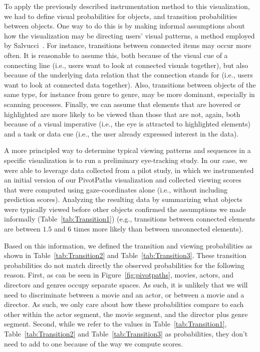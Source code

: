 To apply the previously described instrumentation method to this visualization, we had to define visual probabilities for objects, and transition probabilities between objects. One way to do this is by making informal assumptions about how the visualization may be directing users' visual patterns, a method employed by Salvucci~\cite{salvucci2000intelligent}. For instance, transitions between connected items may occur more often. It is reasonable to assume this, both because of the visual cue of a connecting line (i.e., users want to look at connected visuals together), but also because of the underlying data relation that the connection stands for (i.e., users want to look at connected data together). Also, transitions between objects of the same type, for instance from genre to genre, may be more dominant, especially in scanning processes. Finally, we can assume that elements that are hovered or highlighted are more likely to be viewed than those that are not, again, both because of a visual imperative (i.e., the eye is attracted to highlighted elements) and a task or data cue (i.e., the user already expressed interest in the data).

A more principled way to determine typical viewing patterns and sequences in a specific visualization is to run a preliminary eye-tracking study. In our case, we were able to leverage data collected from a pilot study, in which we instrumented an initial version of our PivotPaths visualization and collected viewing scores that were computed using gaze-coordinates alone (i.e., without including prediction scores). Analyzing the resulting data by summarizing what objects were typically viewed before other objects confirmed the assumptions we made informally (Table~\ref{tab:Transition1}) (e.g., transitions between connected elements are between $1.5$ and $6$ times more likely than between unconnected elements). 

Based on this information, we defined the transition and viewing probabilities as shown in Table~\ref{tab:Transition2} and Table~\ref{tab:Transition3}. These transition probabilities do not match directly the observed probabilities for the following reason. First, as can be seen in Figure~\ref{fig:pivotpaths}, movies, actors, and directors and genres occupy separate spaces. As such, it is unlikely that we will need to discriminate between a movie and an actor, or between a movie and a director. As such, we only care about how these probabilities compare to each other within the actor segment, the movie segment, and the director plus genre segment. Second, while we refer to the values in Table~\ref{tab:Transition1}, Table~\ref{tab:Transition2} and Table~\ref{tab:Transition3} as probabilities, they don't need to add to one because of the way we compute scores. 

